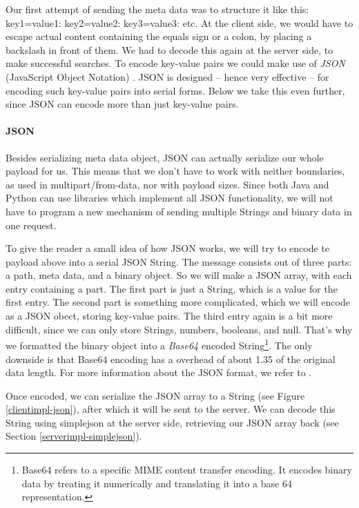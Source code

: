 Our first attempt of sending the meta data was to structure it like this:
key1=value1: key2=value2: key3=value3: etc. At the client side, we would have to
escape actual content containing the equals sign or a colon, by placing a
backslash in front of them. We had to decode this again at the server side, to
make successful searches. To encode key-value pairs we could make use of
\emph{JSON} (JavaScript Object Notation) \cite{json-www}. JSON is designed --
hence very effective -- for encoding such key-value pairs into serial forms.
Below we take this even further, since JSON can encode more than just
key-value pairs.

\paragraph{JSON}
Besides serializing meta data object, JSON can actually serialize our whole
payload for us. This means that we don't have to work with neither boundaries,
as used in multipart/from-data, nor with payload sizes. Since both Java and
Python can use libraries which implement all JSON functionality, we will not
have to program a new mechanism of sending multiple Strings and binary data
in one request. 

To give the reader a small idea of how JSON works, we will try to encode te
payload above into a serial JSON String. The message consists out of three parts:
a path, meta data, and a binary object. So we will make a JSON array, with each
entry containing a part. The first part is just a String, which is a value for
the first entry. The second part is something more complicated, which we will
encode as a JSON obect, storing key-value pairs. The third entry again is a bit
more difficult, since we can only store Strings, numbers, booleans, and null.
That's why we formatted the binary object into a \emph{Base64} encoded
String\footnote{Base64 refers to a specific MIME content transfer encoding. It
encodes binary data by treating it numerically and translating it into a base 64
representation.}. The only downside is that Base64 encoding has a overhead of
about 1.35 of the original data length. For more information about the JSON
format, we refer to \cite{json-www}.

Once encoded, we can serialize the JSON array to a String (see Figure
\ref{clientimpl-json}), after which it will be sent to the server. We can decode
this String using simplejson at the server side, retrieving our JSON array back
(see Section \ref{serverimpl-simplejson}). 


